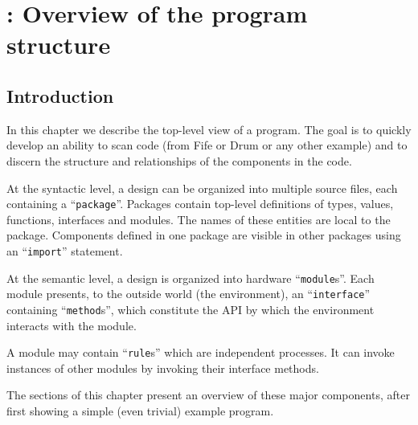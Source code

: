 

\chapter{{\BSV}: Overview of the {\BSV} program structure}


\setcounter{page}{1}
\renewcommand{\thepage}{\arabic{chapter}-\arabic{page}}

\label{ch_Packages}


\section{Introduction}

In this chapter we describe the top-level view of a {\BSV} program.  The
goal is to quickly develop an ability to scan {\BSV} code (from Fife or
Drum or any other example) and to discern the structure and
relationships of the components in the code.

At the syntactic level, a {\BSV} design can be organized into multiple
source files, each containing a {\BSV} ``\verb|package|''.  Packages
contain top-level definitions of types, values, functions, interfaces
and modules.  The names of these entities are local to the package.
Components defined in one package are visible in other packages using
an ``\verb|import|'' statement.

At the semantic level, a {\BSV} design is organized into hardware
``\verb|module|s''.  Each module presents, to the outside world (the
environment), an ``\verb|interface|'' containing ``\verb|method|s'',
which constitute the API by which the environment interacts with the
module.

A module may contain ``\verb|rule|s'' which are independent processes.
It can invoke instances of other modules by invoking their interface
methods.

The sections of this chapter present an overview of these major
components, after first showing a simple (even trivial) example {\BSV}
program.


